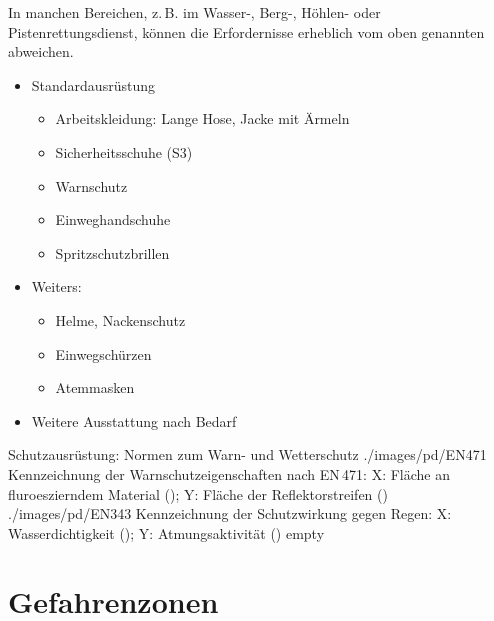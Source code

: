 {{In manchen Bereichen, z.\,B. im Wasser-, Berg-, Höhlen- oder
Pistenrettungsdienst, können die Erfordernisse erheblich vom
oben genannten abweichen.}
{
\begin{itemize}
  \item Standardausrüstung
  \begin{itemize}
    \item Arbeitskleidung: Lange Hose, Jacke mit Ärmeln
    \item Sicherheitsschuhe (S3)
    \item Warnschutz
    \item Einweghandschuhe
    \item Spritzschutzbrillen
  \end{itemize}
  \item Weiters:
  \begin{itemize}
    \item Helme, Nackenschutz
    \item Einwegschürzen
    \item Atemmasken
  \end{itemize}
  \item Weitere Ausstattung nach Bedarf
\end{itemize}
}
{}
{}
{}



\begin{PictureSeries}{}{Schutzausrüstung: Normen zum Warn-
und Wetterschutz\label{fig:normen-warnschutz-wetterschutz}}
{./images/pd/EN471}
{Kennzeichnung der Warnschutzeigenschaften nach EN\,471: X:
Fläche an fluroeszierndem Material (); Y:
Fläche der Reflektorstreifen ()}
{./images/pd/EN343}
{Kennzeichnung der Schutzwirkung gegen Regen: X:
Wasserdichtigkeit (); Y: Atmungsaktivität ()}
{empty}
{}
{}
{}
\end{PictureSeries}

}

\section{Gefahrenzonen}
\label{topic:gefahrenzonen}

